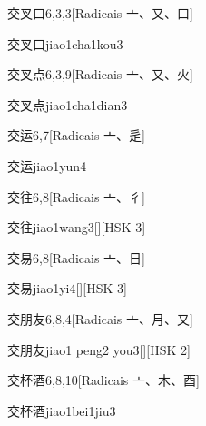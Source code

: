 \begin{entry}{交叉口}{6,3,3}[Radicais ⼇、⼜、⼝]
  \begin{phonetics}{交叉口}{jiao1cha1kou3}
  \end{phonetics}
\end{entry}

\begin{entry}{交叉点}{6,3,9}[Radicais ⼇、⼜、⽕]
  \begin{phonetics}{交叉点}{jiao1cha1dian3}
  \end{phonetics}
\end{entry}

\begin{entry}{交运}{6,7}[Radicais ⼇、⾡]
  \begin{phonetics}{交运}{jiao1yun4}
  \end{phonetics}
\end{entry}

\begin{entry}{交往}{6,8}[Radicais ⼇、⼻]
  \begin{phonetics}{交往}{jiao1wang3}[][HSK 3]
  \end{phonetics}
\end{entry}

\begin{entry}{交易}{6,8}[Radicais ⼇、⽇]
  \begin{phonetics}{交易}{jiao1yi4}[][HSK 3]
  \end{phonetics}
\end{entry}

\begin{entry}{交朋友}{6,8,4}[Radicais ⼇、⽉、⼜]
  \begin{phonetics}{交朋友}{jiao1 peng2 you3}[][HSK 2]
  \end{phonetics}
\end{entry}

\begin{entry}{交杯酒}{6,8,10}[Radicais ⼇、⽊、⾣]
  \begin{phonetics}{交杯酒}{jiao1bei1jiu3}
  \end{phonetics}
\end{entry}


